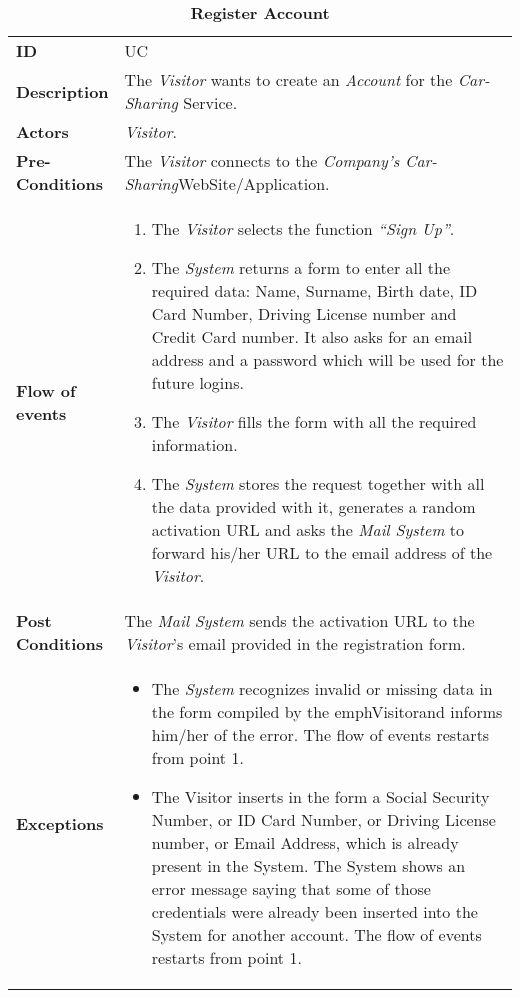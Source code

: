 

\begin{longtable}{|p{0.2\linewidth} p{0.8\linewidth}|}
	\captionsetup{labelformat=empty} %
	\caption{\textbf{Register Account}} %
	\label{UC_Register}%
	\\ \hline %
	
	\textbf{ID} & UC\theUseCaseIdCounter \\ \hline
	\textbf{Description} & The \emph{Visitor} wants to create an \emph{Account} for the \emph{Car-Sharing} Service. \\ \hline
	\textbf{Actors} & \emph{Visitor}.\\ \hline
	\textbf{Pre-Conditions} & The \emph{Visitor} connects to the \emph{Company's Car-Sharing}WebSite/Application. \\ \hline
	\textbf{Flow of events} & 
		\begin{enumerate}
			\item The \emph{Visitor} selects the function \textit{\textquotedblleft{Sign Up}\textquotedblright}.
			\item The \emph{System} returns a form to enter all the required data: Name, Surname, Birth date, ID Card Number, Driving License number and Credit Card number. It also asks for an email address and a password which will be used for the future logins.
			\item The \emph{Visitor} fills the form with all the required information.
			\item The \emph{System} stores the request together with all the data provided with it, generates a random activation URL and asks the \emph{Mail System} to forward his/her URL to the email address of the \emph{Visitor}.
		\end{enumerate}	 \\ \hline
	\textbf{Post Conditions} & The \emph{Mail System} sends the activation URL to the \emph{Visitor}'s email provided in the registration form. \\ \hline
	\textbf{Exceptions} & 
		\begin{itemize}
		\item The \emph{System} recognizes invalid or missing data in the form compiled by the emph{Visitor}and informs him/her of the error. The flow of events restarts from point 1.
		\item The Visitor inserts in the form a Social Security Number, or ID Card Number, or Driving License number, or Email Address, which is already present in the System. The System shows an error message saying that some of those credentials were already been inserted into the System for another account. The flow of events restarts from point 1.
		\end{itemize} \\ \hline
\end{longtable}


